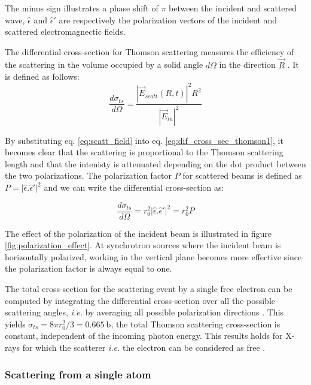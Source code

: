The minus sign illustrates a phase shift of $\pi$ between the incident and scattered wave, $\hat{\epsilon}$ and $\hat{\epsilon}'$ are respectively the polarization vectors of the incident and scattered electromagnectic fields.

The differential cross-section for Thomson scattering measures the efficiency of the scattering in the volume occupied by a solid angle $d\Omega$ in the direction $\vec{R}$ \parencite{NielsenMcMorrow}. It is defined as follows:
\begin{equation}
    \label{eq:dif_cross_sec_thomson1}
    \frac{d\sigma_{ts}} {d \Omega} = \frac{ |\vec{E}_{scatt}(R, t)|^2 R^2} {|\vec{E}_{in}|^2}
\end{equation}

By substituting eq. \ref{eq:scatt_field} into eq. \ref{eq:dif_cross_sec_thomson1}, it becomes clear that the scattering is proportional to the Thomson scattering length and that the intenisty is attenuated depending on the dot product between the two polarizations.
The polarization factor $P$ for scattered beams is defined as $P =  | \hat{\epsilon}.\hat{\epsilon}'|^2$ and we can write the differential cross-section as:

\begin{equation}
    \frac{d\sigma_{ts}} {d \Omega} = r_0^2 | \hat{\epsilon}.\hat{\epsilon}'|^2 = r_0^2 P
\end{equation}

The effect of the polarization of the incident beam is illustrated in figure \ref{fig:polarization_effect}.
At synchrotron sources where the incident beam is horizontally polarized, working in the vertical plane becomes more effective since the polarization factor is always equal to one.

The total cross-section for the scattering event by a single free electron can be computed by integrating the differential cross-section over all the possible scattering angles, \textit{i.e.} by averaging all possible polarization directions \parencite{Willmott}.
This yields $\sigma_{ts} = 8 \pi r_0^2 /3 = 0.665 \:\si{\barn}$, the total Thomson scattering cross-section is constant, independent of the incoming photon energy. This results holds for X-rays for which the scatterer \textit{i.e.} the electron can be considered as free \parencite{Willmott}.

\subsubsection{Scattering from a single atom}

